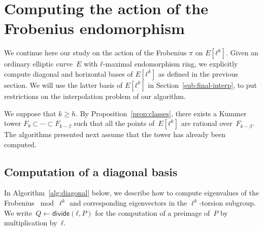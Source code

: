 \documentclass{lms}
\def\sfdiv{\mathsf{divide}}
\begin{document}
\section{Computing the action of the Frobenius endomorphism}
\label{sec:acti-frob-endm}


We continue here our study on the action of the Frobenius $π$ on
$E[ℓ^k]$.  Given an ordinary elliptic curve~$E$ with $ℓ$-maximal endomorphism
ring, we explicitly compute diagonal and horizontal bases of $E[ℓ^k]$
as defined in the previous section.  We will use the latter basis of
$E[ℓ^k]$ in Section~\ref{sub:final-interp}, to put restrictions on the
interpolation problem of our algorithm.

We suppose that $k \geqslant h$. By Proposition~\ref{prop:classes}, there exists a Kummer tower
$F₀⊂\cdots⊂F_{k-\beta}$ such that all the points of~$E[ℓ^k]$ are
rational over~$F_{k-\beta}$. The algorithms presented next assume that
the tower has already been computed.

\subsection{Computation of a diagonal basis}
\label{ss:diagonal}

In Algorithm~\ref{alg:diagonal} below, we describe how to compute
eigenvalues of the Frobenius $\bmod \ell^k$ and corresponding
eigenvectors in the $\ell^{k}$-torsion subgroup.  We
write~$Q ← \sfdiv(ℓ, P)$ for the computation of a preimage of~$P$ by
multiplication by~$ℓ$.
\end{document}
